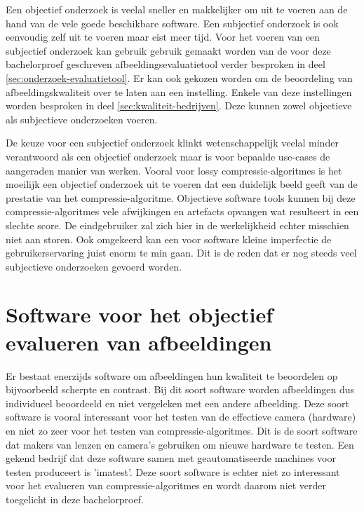 Een objectief onderzoek is veelal sneller en makkelijker om uit te voeren aan de hand van de vele goede beschikbare software. Een subjectief onderzoek is ook eenvoudig zelf uit te voeren maar eist meer tijd. Voor het voeren van een subjectief onderzoek kan gebruik gebruik gemaakt worden van de voor deze bachelorproef geschreven \gls{afbeeldingsevaluatietool} verder besproken in deel \ref{sec:onderzoek-evaluatietool}. Er kan ook gekozen worden om de beoordeling van afbeeldingskwaliteit over te laten aan een instelling. Enkele van deze instellingen worden besproken in deel \ref{sec:kwaliteit-bedrijven}. Deze kunnen zowel objectieve als subjectieve onderzoeken voeren.

De keuze voor een subjectief onderzoek klinkt wetenschappelijk veelal minder verantwoord als een objectief onderzoek maar is voor bepaalde \glspl{use-case} de aangeraden manier van werken. Vooral voor \gls{lossy} \glspl{compressie-algoritme} is het moeilijk een objectief onderzoek uit te voeren dat een duidelijk beeld geeft van de prestatie van het \gls{compressie-algoritme}. Objectieve software tools kunnen bij deze \glspl{compressie-algoritme} vele afwijkingen en \glspl{artefact} opvangen wat resulteert in een slechte score. De eindgebruiker zal zich hier in de werkelijkheid echter misschien niet aan storen. Ook omgekeerd kan een voor software kleine imperfectie de gebruikerservaring juist enorm te min gaan. Dit is de reden dat er nog steeds veel subjectieve onderzoeken gevoerd worden. 

\section{Software voor het objectief evalueren van afbeeldingen}
\label{sec:kwaliteit-tools}

Er bestaat enerzijds software om afbeeldingen hun kwaliteit te beoordelen op bijvoorbeeld scherpte en contrast. Bij dit soort software worden afbeeldingen dus individueel beoordeeld en niet vergeleken met een andere afbeelding. Deze soort software is vooral interessant voor het testen van de effectieve camera (hardware) en niet zo zeer voor het testen van \glspl{compressie-algoritme}. Dit is de soort software dat makers van lenzen en camera's gebruiken om nieuwe hardware te testen. Een gekend bedrijf dat deze software samen met geautomatiseerde machines voor testen produceert is 'imatest'. Deze soort software is echter niet zo interessant voor het evalueren van \glspl{compressie-algoritme} en wordt daarom niet verder toegelicht in deze bachelorproef.

